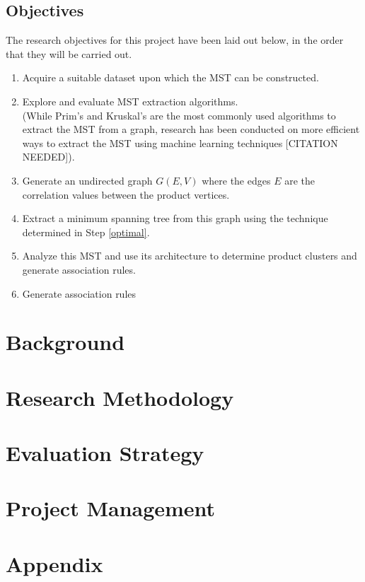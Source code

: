 \documentclass[a4paper,11pt]{article}
\begin{document}
\subsection{Objectives}
The research objectives for this project have been laid out below, in the order that they will be carried out.
\begin{enumerate}
\item Acquire a suitable dataset upon which the MST can be constructed.

\item \label{optimal} Explore and evaluate MST extraction algorithms.
\\(While Prim's \cite{prims}\cite{prims_og} and Kruskal's \cite{kruskal} are the most commonly used algorithms to extract the MST from a graph, research has been conducted on more efficient ways to extract the MST using machine learning techniques [CITATION NEEDED]).

\item Generate an undirected graph $G(E,V)$ where the edges $E$ are the correlation values between the product vertices.

\item Extract a minimum spanning tree from this graph using the technique determined in Step \ref{optimal}. 

\item Analyze this MST and use its architecture to determine product clusters and generate association rules.

\item Generate association rules 

\end{enumerate}

\section{Background}

\section{Research Methodology}

\section{Evaluation Strategy}

\section{Project Management}


\newpage
\printbibliography

\newpage
\section*{Appendix}
\end{document}
